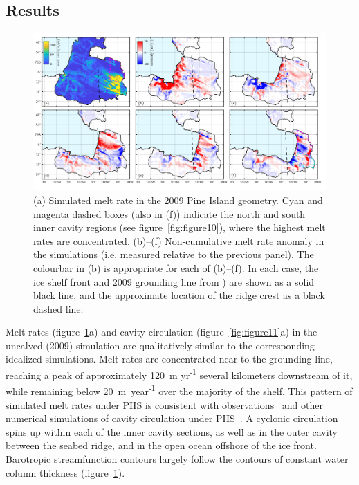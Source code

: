 \documentclass[draft]{agujournal2019}
\begin{document}
\subsection{Results}

\begin{figure}
    \centering
    \includegraphics[width = \textwidth]{../make_figures/plots/figure12.pdf}
    \caption{(a) Simulated melt rate in the 2009 Pine Island geometry. Cyan and magenta dashed boxes (also in (f)) indicate the north and south inner cavity regions (see figure~\ref{fig:figure10}), where the highest melt rates are concentrated. (b)--(f) Non-cumulative melt rate anomaly in the simulations (i.e. measured relative to the previous panel). The colourbar in (b) is appropriate for each of (b)--(f). In each case, the ice shelf front and 2009 grounding line from \cite{Joughin2010GRL}) are shown as a solid black line, and the approximate location of the ridge crest as a black dashed line.} 
    \label{fig:figure12}
\end{figure}


Melt rates (figure~\ref{fig:figure12}a) and cavity circulation (figure~\ref{fig:figure11}a) in the uncalved (2009) simulation are qualitatively similar to the corresponding idealized simulations. Melt rates are concentrated near to the grounding line, reaching a peak of approximately 120~m yr\textsuperscript{-1} several kilometers downstream of it, while remaining below 20~m~year\textsuperscript{-1} over the majority of the shelf. This pattern of simulated melt rates under PIIS is consistent with observations~\cite{Dutrieux2013Cryosphere} and other numerical simulations of cavity circulation under PIIS~\cite{Heimbach2012AnnGlac}. A cyclonic circulation spins up within each of the inner cavity sections, as well as in the outer cavity between the seabed ridge, and in the open ocean offshore of the ice front. Barotropic streamfunction contours largely follow the contours of constant water column thickness (figure~\ref{fig:figure12}).
\end{document}
